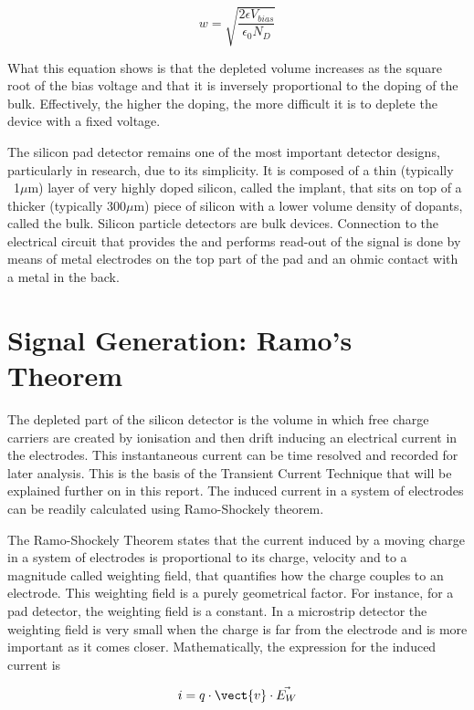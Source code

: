 \begin{equation}
w = \sqrt{\frac{2\epsilon V_{bias}}{\epsilon_0 N_D}}
\label{eq:widthVias}
\end{equation}

What this equation shows is that the depleted volume increases as the square
root of the bias voltage and that it is inversely proportional to the doping of the
bulk. Effectively, the higher the doping, the more difficult it is to deplete the
device with a fixed voltage. 

The silicon pad detector remains one of the most important detector designs,
particularly in research, due to its simplicity. It is composed of a thin
(typically ~1$\mu$m) layer of very highly doped silicon, called the implant,
that sits on top of a thicker (typically 300$\mu$m) piece of silicon with a
lower volume density of dopants, called the bulk. Silicon particle detectors are
bulk devices. Connection to the electrical circuit that provides the \vias and
performs read-out of the signal is done by means of metal electrodes on the top
part of the pad and an ohmic contact with a metal in the back. 

\section{Signal Generation: Ramo's Theorem} %

The depleted part of the silicon detector is the volume in which free
charge carriers are created by ionisation and then drift inducing an electrical
current in the electrodes. This instantaneous current can be time resolved and
recorded for later analysis. This is the basis of the Transient Current
Technique that will be explained further on in this report. The induced current
in a system of electrodes can be readily calculated using Ramo-Shockely theorem.


The Ramo-Shockely Theorem states that the current induced by a moving charge in
a system of electrodes is proportional to its charge, velocity and to a
magnitude called weighting field, that quantifies how the charge couples to an
electrode. This weighting field is a purely geometrical factor. For instance,
for a pad detector, the weighting field is a constant. In a microstrip detector
the weighting field is very small when the charge is far from the electrode and
is more important as it comes closer. Mathematically, the expression for the
induced current is

\begin{equation}
	i = q \cdot \vect{v} \cdot \vec{E_{W}}
	\label{eq:ramo} 
\end{equation} 

